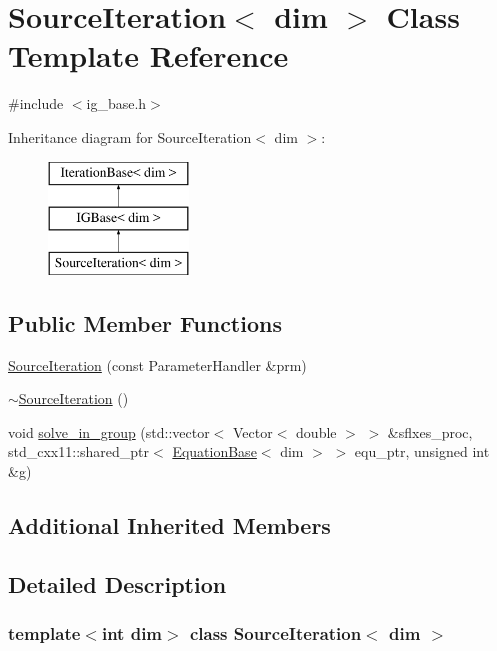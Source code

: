 \hypertarget{class_source_iteration}{}\section{Source\+Iteration$<$ dim $>$ Class Template Reference}
\label{class_source_iteration}


{\ttfamily \#include $<$ig\+\_\+base.\+h$>$}

Inheritance diagram for Source\+Iteration$<$ dim $>$\+:\begin{figure}[H]
\begin{center}
\leavevmode
\includegraphics[height=3.000000cm]{class_source_iteration}
\end{center}
\end{figure}
\subsection*{Public Member Functions}
\begin{DoxyCompactItemize}
\item 
\hyperlink{class_source_iteration_a50f7b38da2b8550f069386606026dc19}{Source\+Iteration} (const Parameter\+Handler \&prm)
\item 
\hyperlink{class_source_iteration_ae18057a8b8501d9e89b08ecfb33ef499}{$\sim$\+Source\+Iteration} ()
\item 
void \hyperlink{class_source_iteration_a6d726b9a581391cc4164c29f4ccd1ca5}{solve\+\_\+in\+\_\+group} (std\+::vector$<$ Vector$<$ double $>$ $>$ \&sflxes\+\_\+proc, std\+\_\+cxx11\+::shared\+\_\+ptr$<$ \hyperlink{class_equation_base}{Equation\+Base}$<$ dim $>$ $>$ equ\+\_\+ptr, unsigned int \&g)
\end{DoxyCompactItemize}
\subsection*{Additional Inherited Members}


\subsection{Detailed Description}
\subsubsection*{template$<$int dim$>$\newline
class Source\+Iteration$<$ dim $>$}



